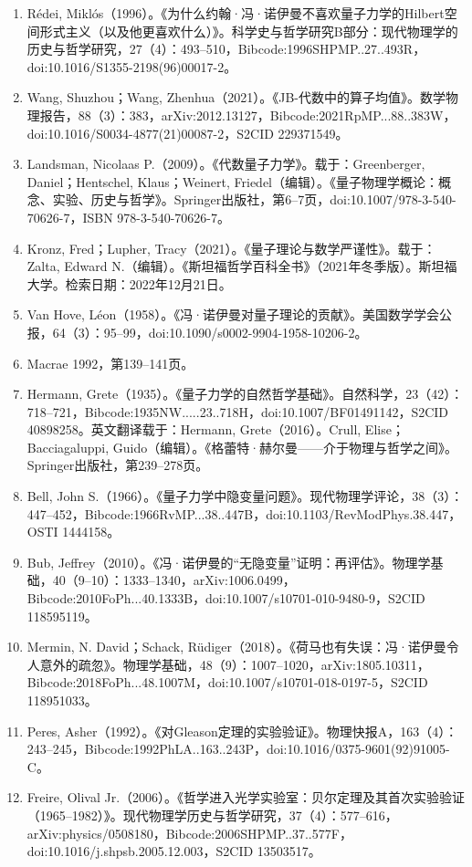 \begin{enumerate}
\item Rédei, Miklós（1996）。《为什么约翰·冯·诺伊曼不喜欢量子力学的Hilbert空间形式主义（以及他更喜欢什么）》。科学史与哲学研究B部分：现代物理学的历史与哲学研究，27（4）：493–510，Bibcode:1996SHPMP..27..493R，doi:10.1016/S1355-2198(96)00017-2。
\item Wang, Shuzhou；Wang, Zhenhua（2021）。《JB-代数中的算子均值》。数学物理报告，88（3）：383，arXiv:2012.13127，Bibcode:2021RpMP...88..383W，doi:10.1016/S0034-4877(21)00087-2，S2CID 229371549。  
\item Landsman, Nicolaas P.（2009）。《代数量子力学》。载于：Greenberger, Daniel；Hentschel, Klaus；Weinert, Friedel（编辑）。《量子物理学概论：概念、实验、历史与哲学》。Springer出版社，第6–7页，doi:10.1007/978-3-540-70626-7，ISBN 978-3-540-70626-7。  
\item Kronz, Fred；Lupher, Tracy（2021）。《量子理论与数学严谨性》。载于：Zalta, Edward N.（编辑）。《斯坦福哲学百科全书》（2021年冬季版）。斯坦福大学。检索日期：2022年12月21日。  
\item Van Hove, Léon（1958）。《冯·诺伊曼对量子理论的贡献》。美国数学学会公报，64（3）：95–99，doi:10.1090/s0002-9904-1958-10206-2。  
\item Macrae 1992，第139–141页。  
\item Hermann, Grete（1935）。《量子力学的自然哲学基础》。自然科学，23（42）：718–721，Bibcode:1935NW.....23..718H，doi:10.1007/BF01491142，S2CID 40898258。英文翻译载于：Hermann, Grete（2016）。Crull, Elise；Bacciagaluppi, Guido（编辑）。《格蕾特·赫尔曼——介于物理与哲学之间》。Springer出版社，第239–278页。  
\item Bell, John S.（1966）。《量子力学中隐变量问题》。现代物理学评论，38（3）：447–452，Bibcode:1966RvMP...38..447B，doi:10.1103/RevModPhys.38.447，OSTI 1444158。
\item Bub, Jeffrey（2010）。《冯·诺伊曼的“无隐变量”证明：再评估》。物理学基础，40（9–10）：1333–1340，arXiv:1006.0499，Bibcode:2010FoPh...40.1333B，doi:10.1007/s10701-010-9480-9，S2CID 118595119。  
\item Mermin, N. David；Schack, Rüdiger（2018）。《荷马也有失误：冯·诺伊曼令人意外的疏忽》。物理学基础，48（9）：1007–1020，arXiv:1805.10311，Bibcode:2018FoPh...48.1007M，doi:10.1007/s10701-018-0197-5，S2CID 118951033。  
\item Peres, Asher（1992）。《对Gleason定理的实验验证》。物理快报A，163（4）：243–245，Bibcode:1992PhLA..163..243P，doi:10.1016/0375-9601(92)91005-C。  
\item Freire, Olival Jr.（2006）。《哲学进入光学实验室：贝尔定理及其首次实验验证（1965–1982）》。现代物理学历史与哲学研究，37（4）：577–616，arXiv:physics/0508180，Bibcode:2006SHPMP..37..577F，doi:10.1016/j.shpsb.2005.12.003，S2CID 13503517。  

\end{enumerate}
